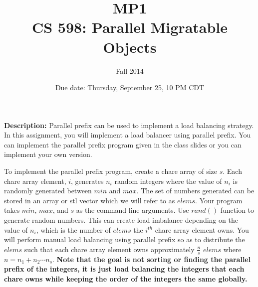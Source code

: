 \documentclass{article}
\title{MP1 \\ CS 598: Parallel Migratable Objects}
\author{Fall 2014}
\date{Due date: Thursday, September 25, 10 PM CDT}
\begin{document}
\maketitle

\textbf{Description:} 
Parallel prefix can be used to implement a load balancing strategy. In this
assignment, you will implement a load balancer using parallel prefix. You
can implement the parallel prefix program given in the class slides or you
can implement your own version. 


To implement the parallel prefix program, create a chare array of size $s$. Each
chare array element, $i$, generates $n_i$ random integers where the value of
$n_i$ is randomly generated between $min$ and $max$. The set of numbers generated
can be stored in an array or stl vector which we will refer to as $elems$. Your program takes $min$,
$max$, and $s$ as the command line arguments. Use $rand()$ function to generate random
numbers. This can create load imbalance depending on the value of $n_i$, which is
the number of $elems$ the $i^{th}$ chare array element owns. You will perform manual load
balancing using parallel prefix so as to distribute the $elems$ such that each
chare array element owns approximately  $\frac{n}{s}$ $elems$ where  $n = n_1 +
n_2 \cdots n_s$. \textbf{Note that the goal is not sorting or finding the
parallel prefix of the integers, it is just load balancing the integers that each chare owns while keeping the order of the integers the same globally.}\\


\end{document}
